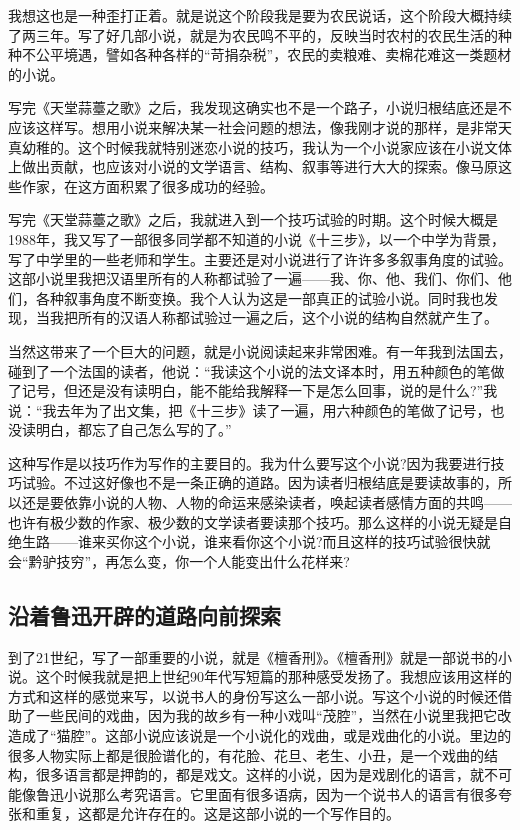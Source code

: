 \documentclass[fontset=fandol,12pt,a5paper]{ctexbook}
\begin{document}
我想这也是一种歪打正着。就是说这个阶段我是要为农民说话，这个阶段大概持续了两三年。写了好几部小说，就是为农民鸣不平的，反映当时农村的农民生活的种种不公平境遇，譬如各种各样的“苛捐杂税”，农民的卖粮难、卖棉花难这一类题材的小说。

写完《天堂蒜薹之歌》之后，我发现这确实也不是一个路子，小说归根结底还是不应该这样写。想用小说来解决某一社会问题的想法，像我刚才说的那样，是非常天真幼稚的。这个时候我就特别迷恋小说的技巧，我认为一个小说家应该在小说文体上做出贡献，也应该对小说的文学语言、结构、叙事等进行大大的探索。像马原这些作家，在这方面积累了很多成功的经验。

写完《天堂蒜薹之歌》之后，我就进入到一个技巧试验的时期。这个时候大概是1988年，我又写了一部很多同学都不知道的小说《十三步》，以一个中学为背景，写了中学里的一些老师和学生。主要还是对小说进行了许许多多叙事角度的试验。这部小说里我把汉语里所有的人称都试验了一遍——我、你、他、我们、你们、他们，各种叙事角度不断变换。我个人认为这是一部真正的试验小说。同时我也发现，当我把所有的汉语人称都试验过一遍之后，这个小说的结构自然就产生了。

当然这带来了一个巨大的问题，就是小说阅读起来非常困难。有一年我到法国去，碰到了一个法国的读者，他说：“我读这个小说的法文译本时，用五种颜色的笔做了记号，但还是没有读明白，能不能给我解释一下是怎么回事，说的是什么?”我说：“我去年为了出文集，把《十三步》读了一遍，用六种颜色的笔做了记号，也没读明白，都忘了自己怎么写的了。”

这种写作是以技巧作为写作的主要目的。我为什么要写这个小说?因为我要进行技巧试验。不过这好像也不是一条正确的道路。因为读者归根结底是要读故事的，所以还是要依靠小说的人物、人物的命运来感染读者，唤起读者感情方面的共鸣——也许有极少数的作家、极少数的文学读者要读那个技巧。那么这样的小说无疑是自绝生路——谁来买你这个小说，谁来看你这个小说?而且这样的技巧试验很快就会“黔驴技穷”，再怎么变，你一个人能变出什么花样来?

\subsection{沿着鲁迅开辟的道路向前探索}

到了21世纪，写了一部重要的小说，就是《檀香刑》。《檀香刑》就是一部说书的小说。这个时候我就是把上世纪90年代写短篇的那种感受发扬了。我想应该用这样的方式和这样的感觉来写，以说书人的身份写这么一部小说。写这个小说的时候还借助了一些民间的戏曲，因为我的故乡有一种小戏叫“茂腔”，当然在小说里我把它改造成了“猫腔”。这部小说应该说是一个小说化的戏曲，或是戏曲化的小说。里边的很多人物实际上都是很脸谱化的，有花脸、花旦、老生、小丑，是一个戏曲的结构，很多语言都是押韵的，都是戏文。这样的小说，因为是戏剧化的语言，就不可能像鲁迅小说那么考究语言。它里面有很多语病，因为一个说书人的语言有很多夸张和重复，这都是允许存在的。这是这部小说的一个写作目的。
\end{document}
